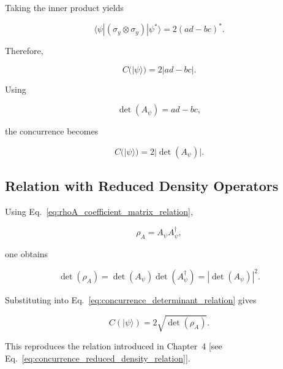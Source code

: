 Taking the inner product yields

\begin{equation}
\langle \psi |
(\sigma_y \otimes \sigma_y)
|\psi^*\rangle
=
2(ad-bc)^*.
\label{eq:spin_flip_inner_product}
\end{equation}

Therefore,

\begin{equation}
C(|\psi\rangle)
=
2|ad-bc|.
\label{eq:pure_state_concurrence_closed_form}
\end{equation}

Using

\begin{equation}
\det(A_\psi)=ad-bc,
\label{eq:coefficient_matrix_determinant}
\end{equation}

the concurrence becomes

\begin{equation}
C(|\psi\rangle)
=
2|\det(A_\psi)|.
\label{eq:concurrence_determinant_relation}
\end{equation}


\subsection*{Relation with Reduced Density Operators}

Using Eq.~\eqref{eq:rhoA_coefficient_matrix_relation},

\begin{equation}
\rho_A
=
A_\psi A_\psi^\dagger,
\end{equation}

one obtains

\begin{equation}
\det(\rho_A)
=
\det(A_\psi)
\det(A_\psi^\dagger)
=
|\det(A_\psi)|^2.
\label{eq:determinant_reduced_density_operator}
\end{equation}

\medskip
Substituting into Eq.~\eqref{eq:concurrence_determinant_relation} gives

\begin{equation}
C(|\psi\rangle)
=
2\sqrt{\det(\rho_A)}.
\end{equation}

This reproduces the relation introduced in Chapter~4 [see Eq.~\eqref{eq:concurrence_reduced_density_relation}].


